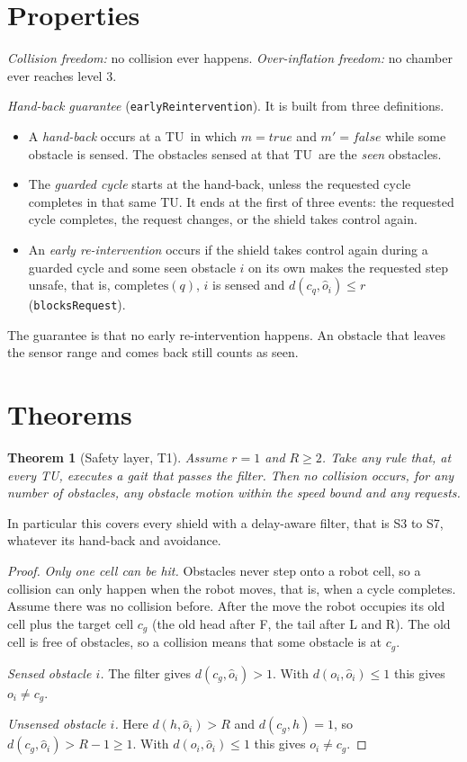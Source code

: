 \documentclass[11pt,a4paper]{article}
\newtheorem{theorem}{Theorem}
\theoremstyle{definition}
\newcommand{\tu}{TU}
\begin{document}
\section{Properties}

\emph{Collision freedom:} no collision ever happens. \emph{Over-inflation freedom:} no chamber ever reaches level 3.

\emph{Hand-back guarantee} (\texttt{earlyReintervention}). It is built from three definitions.
\begin{itemize}
  \item A \emph{hand-back} occurs at a \tu\ in which $m=\mathit{true}$ and $m'=\mathit{false}$ while some obstacle is sensed. The obstacles sensed at that \tu\ are the \emph{seen} obstacles.
  \item The \emph{guarded cycle} starts at the hand-back, unless the requested cycle completes in that same \tu. It ends at the first of three events: the requested cycle completes, the request changes, or the shield takes control again.
  \item An \emph{early re-intervention} occurs if the shield takes control again during a guarded cycle and some seen obstacle $i$ on its own makes the requested step unsafe, that is, $\mathrm{completes}(q)$, $i$ is sensed and $d(c_q,\hat o_i)\le r$ (\texttt{blocksRequest}).
\end{itemize}
The guarantee is that no early re-intervention happens. An obstacle that leaves the sensor range and comes back still counts as seen.

\section{Theorems}

\begin{theorem}[Safety layer, T1]\label{thm:t1}
Assume $r=1$ and $R\ge2$. Take any rule that, at every \tu, executes a gait that passes the filter. Then no collision occurs, for any number of obstacles, any obstacle motion within the speed bound and any requests.
\end{theorem}

In particular this covers every shield with a delay-aware filter, that is S3 to S7, whatever its hand-back and avoidance.

\begin{proof}
\emph{Only one cell can be hit.} Obstacles never step onto a robot cell, so a collision can only happen when the robot moves, that is, when a cycle completes. Assume there was no collision before. After the move the robot occupies its old cell plus the target cell $c_g$ (the old head after F, the tail after L and R). The old cell is free of obstacles, so a collision means that some obstacle is at $c_g$.

\emph{Sensed obstacle $i$.} The filter gives $d(c_g,\hat o_i)>1$. With $d(o_i,\hat o_i)\le1$ this gives $o_i\ne c_g$.

\emph{Unsensed obstacle $i$.} Here $d(h,\hat o_i)>R$ and $d(c_g,h)=1$, so $d(c_g,\hat o_i)>R-1\ge1$. With $d(o_i,\hat o_i)\le1$ this gives $o_i\ne c_g$.
\end{proof}
\end{document}
